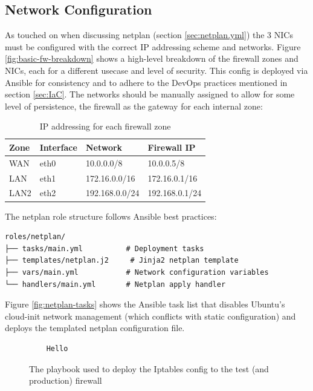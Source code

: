 \subsection{Network Configuration}
\label{subsec:network-config}
As touched on when discussing netplan (section \ref{sec:netplan.yml}) \parencite{Ubuntu2024NetplanDesign} the 3 NICs must be configured with the correct IP addressing scheme and networks. Figure \ref{fig:basic-fw-breakdown} shows a high-level breakdown of the firewall zones and NICs, each for a different usecase and level of security. This config is deployed via Ansible for consistency and to adhere to the DevOps practices mentioned in section \ref{sec:IaC}. The networks should be manually assigned to allow for some level of persistence, the firewall as the gateway for each internal zone:

\begin{table}[H]
\centering
\begin{tabular}{|l|l|l|l|}
\hline
\textbf{Zone} & \textbf{Interface} & \textbf{Network} & \textbf{Firewall IP} \\ \hline
WAN & eth0 & 10.0.0.0/8 & 10.0.0.5/8 \\ \hline
LAN & eth1 & 172.16.0.0/16 & 172.16.0.1/16 \\ \hline
LAN2 & eth2 & 192.168.0.0/24 & 192.168.0.1/24 \\ \hline
\end{tabular}
\caption{IP addressing for each firewall zone}
\label{tab:ip-addressing}
\end{table}

The netplan role structure follows Ansible best practices:

\begin{verbatim}
roles/netplan/
├── tasks/main.yml          # Deployment tasks
├── templates/netplan.j2     # Jinja2 netplan template
├── vars/main.yml           # Network configuration variables
└── handlers/main.yml       # Netplan apply handler
\end{verbatim}

Figure \ref{fig:netplan-tasks} shows the Ansible task list that disables Ubuntu's cloud-init network management (which conflicts with static configuration) and deploys the templated netplan configuration file.

\begin{figure}[H]
    \centering
    \begin{verbatim}
    Hello
    \end{verbatim}
    \caption{The playbook used to deploy the Iptables config to the test (and production) firewall}
    \label{code:ansible-neplan-tasks}
\end{figure}

